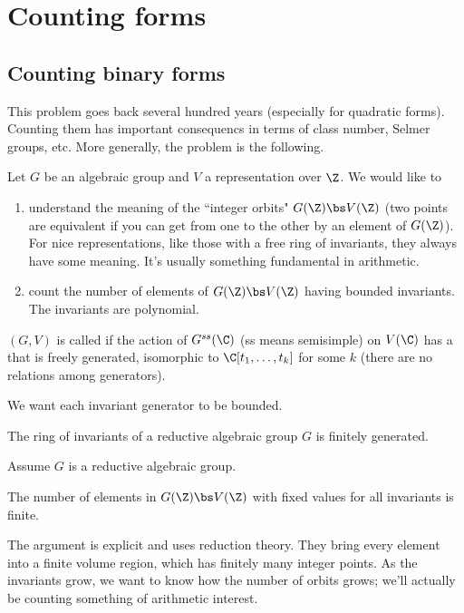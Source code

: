 

\chapter{Counting forms}
\section{Counting binary forms}
This problem goes back several hundred years (especially for quadratic forms). Counting them has important consequencs in terms of class number, Selmer groups, etc. More generally, the problem is the following.

Let $G$ be an algebraic group and $V$ a representation over $\Z$. %
We would like to
\begin{enumerate}
\item
understand the meaning of the ``integer orbits" $G(\Z)\bs V(\Z)$ (two points are equivalent if you can get from one to the other by an element of $G(\Z)$). For nice representations, like those with a free ring of invariants, they always have some meaning. It's usually something fundamental in arithmetic.
\item count the number of elements of $G(\Z)\bs V(\Z)$ having bounded invariants. The invariants are polynomial. %
\end{enumerate}
\begin{df}
$(G,V)$ is called  if the action of $G^{ss}(\C)$ (ss means semisimple) %
on $V(\C)$ has a  that is freely generated, isomorphic to $\C[t_1,\ldots, t_k]$ for some $k$ (there are no relations among generators).
\end{df}
We want each invariant generator to be bounded.

\begin{thm}
The ring of invariants of a reductive algebraic group $G$ is finitely generated.
\end{thm}
\begin{thm}
Assume $G$ is a reductive algebraic group. 

The number of elements in $G(\Z)\bs V(\Z)$ with fixed values for 
all invariants 
is finite.
\end{thm}
The argument is explicit and uses reduction theory. They bring every element into a finite volume region, which has finitely many integer points. As the invariants grow, we want to know how the number of orbits grows; we'll actually be counting something of arithmetic interest.

